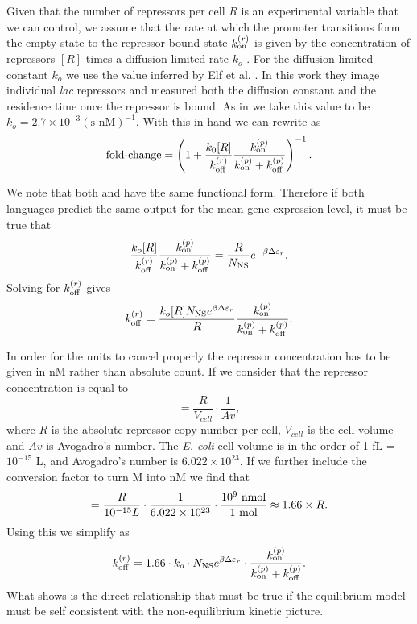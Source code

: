Given that the number of repressors per cell $R$ is an experimental variable
that we can control, we assume that the rate at which the promoter transitions
form the empty state to the repressor bound state $k^{(r)}_{\text{on}}$ is given by the
concentration of repressors $[R]$ times a diffusion limited rate $k_o$
\cite{Jones2014a}.  For the diffusion limited constant $k_o$ we use the value
inferred by Elf et al. \cite{Elf2007}. In this work they image individual
\textit{lac} repressors and measured both the diffusion constant and the
residence time once the repressor is bound. As in \cite{Jones2014a} we take this
value to be $k_o = 2.7 \times 10^{-3} (\text{s nM})^{-1}$. With this in hand we
can rewrite
 as
\begin{equation}
  \text{fold-change} = \left( 1 + {k_0 [R] \over k^{(r)}_{\text{off}}}
                {k^{(p)}_{\text{on}} \over k^{(p)}_{\text{on}} + k^{(p)}_{\text{off}}} \right)^{-1}.
  \label{eq_fc_kinetic}
\end{equation}

We note that both  and  have the same
functional form. Therefore if both languages predict the same output for the
mean gene expression level, it must be true that
\begin{equation}
  {k_o [R] \over k^{(r)}_{\text{off}}}{k^{(p)}_{\text{on}}\over k^{(p)}_{\text{on}}+ k^{(p)}_{\text{off}}} =
  {R \over N_\text{NS}} e^{-\beta\Delta\varepsilon_r}.
\end{equation}
Solving for $k^{(r)}_{\text{off}}$ gives
\begin{equation}
  k^{(r)}_{\text{off}} = {k_o [R] N_\text{NS} e^{\beta\Delta\varepsilon_r} \over R}{k^{(p)}_{\text{on}} \over k^{(p)}_{\text{on}} + k^{(p)}_{\text{off}}}.
  \label{eq_kroff_complete}
\end{equation}

In order for the units to cancel properly the repressor concentration has to be
given in nM rather than absolute count. If we consider that the repressor
concentration is equal to
\begin{equation}
[R] = \frac{R}{V_{cell}}\cdot \frac{1}{Av},
\end{equation}
where $R$ is the absolute repressor copy number per cell, $V_{cell}$ is the cell
volume and $Av$ is Avogadro's number. The \textit{E. coli} cell volume is in the
order of 1 fL = $10^{-15}$ L, and Avogadro's number is $6.022 \times 10^{23}$.
If we further include the conversion factor to turn M into nM we find that
\begin{equation}
[R] = {R \over 10^{-15} L} \cdot {1 \over 6.022 \times 10^{23}}
\cdot {10^9 \text{ nmol} \over 1 \text{ mol}} \approx 1.66 \times R.
\end{equation}
Using this we simplify  as
\begin{equation}
  k^{(r)}_{\text{off}} = 1.66 \cdot k_o \cdot N_\text{NS} e^{\beta\Delta\varepsilon_r}
   \cdot {k^{(p)}_{\text{on}}\over k^{(p)}_{\text{on}}+ k^{(p)}_{\text{off}}}.
  \label{eq_kroff}
\end{equation}
What  shows is the direct relationship that must be true if the
equilibrium model must be self consistent with the non-equilibrium kinetic
picture.
